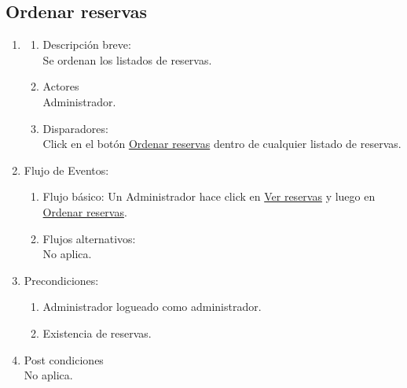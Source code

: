 \documentclass[a4paper,11pt]{article}
\begin{document}
\subsection{Ordenar reservas}
\begin{enumerate}

    \item
    \begin{enumerate}
    \item Descripción breve: \\
        Se ordenan los listados de reservas.
    \item Actores \\
        Administrador.
    \item Disparadores: \\
        Click en el botón \underline{Ordenar reservas}
        dentro de cualquier listado de reservas.
    \end{enumerate}

    \item Flujo de Eventos: 

    \begin{enumerate}

        \item Flujo básico:
            Un Administrador hace click en \underline{Ver reservas} y luego
            en \underline{Ordenar reservas}.
        \item Flujos alternativos:\\
            No aplica.
    \end{enumerate}

    \item Precondiciones: \\
        \begin{enumerate}
            \item Administrador logueado como administrador.
            \item Existencia de reservas.
        \end{enumerate}

    \item Post condiciones \\
        No aplica.

\end{enumerate}
\end{document}
